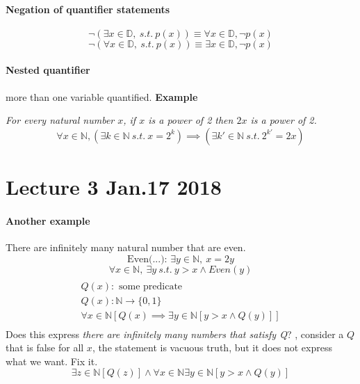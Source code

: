 \documentclass{article}
\begin{document}
	\paragraph{Negation of quantifier statements}
	\[
	\neg (\exists x \in \mathbb{D},\ s.t.\ p(x)) \equiv \forall x \in \mathbb{D}, \neg p(x)
	\]
	\[
	\neg (\forall x \in \mathbb{D},\ s.t.\ p(x)) \equiv \exists x \in \mathbb{D}, \neg p(x)
	\]
	\paragraph{Nested quantifier} more than one variable quantified.
	\newline \textbf{Example}
	
	\emph{For every natural number $x$, if $x$ is a power of 2 then $2x$ is a power of 2.}
	\[
	\forall x \in \mathbb{N}, (\exists k \in \mathbb{N}\ s.t.\ x = 2^k) \implies (\exists k' \in \mathbb{N}\ s.t.\ 2^{k'} = 2x)
	\]
	
	\section{Lecture 3 Jan.17 2018}
	\paragraph{Another example} There are infinitely many natural number that are even.
	\[
	\text{Even(...): } \exists y \in \mathbb{N},\ x = 2y
	\]
	\[
	\forall x \in \mathbb{N},\ \exists y\ s.t.\ y > x \land Even(y)
	\]
	\begin{multline*}
	\\	
	Q(x) : \text{ some predicate} \\
	Q(x): \mathbb{N} \to \{0,1\} \\
	\forall x \in \mathbb{N} [Q(x) \implies \exists y \in \mathbb{N}[y>x \land Q(y)]]
	\\
	\end{multline*}
	Does this express \emph{there are infinitely many numbers that satisfy Q}?
	\newline {}, consider a $Q$ that is false for all $x$, the statement is vacuous truth, but it does not express what we want.
	\newline Fix it.
	\[
	\exists z \in \mathbb{N} [Q(z)] \land \forall x \in \mathbb{N} \exists y \in \mathbb{N} [y > x \land Q(y)]
	\]
\end{document}
